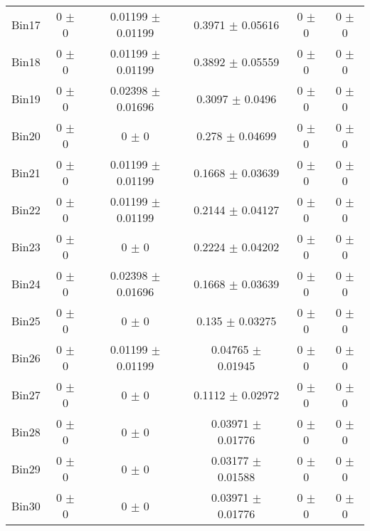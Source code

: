 \begin{tabular}{@{\extracolsep{4pt}}lccccc@{}}
     Bin17 & 0 $\pm$ 0 & 0.01199 $\pm$ 0.01199 & 0.3971 $\pm$ 0.05616 & 0 $\pm$ 0 & 0 $\pm$ 0 \\ 
     Bin18 & 0 $\pm$ 0 & 0.01199 $\pm$ 0.01199 & 0.3892 $\pm$ 0.05559 & 0 $\pm$ 0 & 0 $\pm$ 0 \\ 
     Bin19 & 0 $\pm$ 0 & 0.02398 $\pm$ 0.01696 & 0.3097 $\pm$ 0.0496 & 0 $\pm$ 0 & 0 $\pm$ 0 \\ 
     Bin20 & 0 $\pm$ 0 & 0 $\pm$ 0 & 0.278 $\pm$ 0.04699 & 0 $\pm$ 0 & 0 $\pm$ 0 \\ 
     Bin21 & 0 $\pm$ 0 & 0.01199 $\pm$ 0.01199 & 0.1668 $\pm$ 0.03639 & 0 $\pm$ 0 & 0 $\pm$ 0 \\ 
     Bin22 & 0 $\pm$ 0 & 0.01199 $\pm$ 0.01199 & 0.2144 $\pm$ 0.04127 & 0 $\pm$ 0 & 0 $\pm$ 0 \\ 
     Bin23 & 0 $\pm$ 0 & 0 $\pm$ 0 & 0.2224 $\pm$ 0.04202 & 0 $\pm$ 0 & 0 $\pm$ 0 \\ 
     Bin24 & 0 $\pm$ 0 & 0.02398 $\pm$ 0.01696 & 0.1668 $\pm$ 0.03639 & 0 $\pm$ 0 & 0 $\pm$ 0 \\ 
     Bin25 & 0 $\pm$ 0 & 0 $\pm$ 0 & 0.135 $\pm$ 0.03275 & 0 $\pm$ 0 & 0 $\pm$ 0 \\ 
     Bin26 & 0 $\pm$ 0 & 0.01199 $\pm$ 0.01199 & 0.04765 $\pm$ 0.01945 & 0 $\pm$ 0 & 0 $\pm$ 0 \\ 
     Bin27 & 0 $\pm$ 0 & 0 $\pm$ 0 & 0.1112 $\pm$ 0.02972 & 0 $\pm$ 0 & 0 $\pm$ 0 \\ 
     Bin28 & 0 $\pm$ 0 & 0 $\pm$ 0 & 0.03971 $\pm$ 0.01776 & 0 $\pm$ 0 & 0 $\pm$ 0 \\ 
     Bin29 & 0 $\pm$ 0 & 0 $\pm$ 0 & 0.03177 $\pm$ 0.01588 & 0 $\pm$ 0 & 0 $\pm$ 0 \\ 
     Bin30 & 0 $\pm$ 0 & 0 $\pm$ 0 & 0.03971 $\pm$ 0.01776 & 0 $\pm$ 0 & 0 $\pm$ 0 \\ 
\hline\hline
  \end{tabular}
